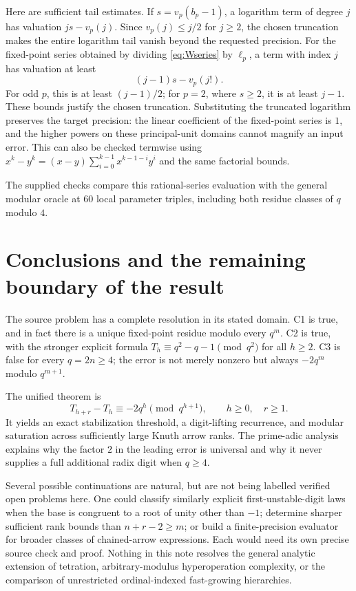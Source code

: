 \documentclass[11pt,a4paper]{article}
\numberwithin{equation}{section}
\theoremstyle{plain}
\theoremstyle{definition}
\begin{document}
Here are sufficient tail estimates.  If $s=v_p(b_p-1)$, a logarithm
term of degree $j$ has valuation $js-v_p(j)$.  Since
$v_p(j)\le j/2$ for $j\ge2$, the chosen truncation makes the entire
logarithm tail vanish beyond the requested precision.
For the fixed-point series obtained by dividing \eqref{eq:Wseries}
by $\ell_p$, a term with index $j$ has valuation at least
\[
 (j-1)s-v_p(j!).
\]
For odd $p$, this is at least $(j-1)/2$; for $p=2$, where $s\ge2$,
it is at least $j-1$.  These bounds justify the chosen truncation.
Substituting the truncated logarithm preserves the target precision:
the linear coefficient of the fixed-point series is $1$, and the
higher powers on these principal-unit domains cannot magnify an input
error.  This can also be checked termwise using
$x^k-y^k=(x-y)\sum_{i=0}^{k-1}x^{k-1-i}y^i$ and the same factorial
bounds.

The supplied checks compare this rational-series evaluation with the
general modular oracle at $60$ local parameter triples, including
both residue classes of $q$ modulo $4$.

\section{Conclusions and the remaining boundary of the result}

The source problem has a complete resolution in its stated domain.
C1 is true, and in fact there is a unique fixed-point residue modulo
every $q^m$.  C2 is true, with the stronger explicit formula
$T_h\equiv q^2-q-1\pmod{q^2}$ for all $h\ge2$.
C3 is false for every $q=2n\ge4$; the error is not merely nonzero but
always $-2q^m$ modulo $q^{m+1}$.

The unified theorem is
\[
 T_{h+r}-T_h\equiv-2q^h\pmod{q^{h+1}},
 \qquad h\ge0,\quad r\ge1.
\]
It yields an exact stabilization threshold, a digit-lifting recurrence,
and modular saturation across sufficiently large Knuth arrow ranks.
The prime-adic analysis explains why the factor $2$ in the leading
error is universal and why it never supplies a full additional radix
digit when $q\ge4$.

Several possible continuations are natural, but are not being labelled
verified open problems here.  One could classify similarly explicit
first-unstable-digit laws when the base is congruent to a root of unity
other than $-1$; determine sharper sufficient rank bounds than
$n+r-2\ge m$; or build a finite-precision evaluator for broader classes
of chained-arrow expressions.  Each would need its own precise source
check and proof.  Nothing in this note resolves the general analytic
extension of tetration, arbitrary-modulus hyperoperation complexity,
or the comparison of unrestricted ordinal-indexed fast-growing
hierarchies.
\end{document}
